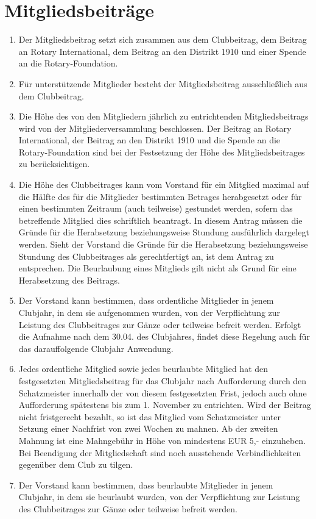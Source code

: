 \documentclass{article}
\begin{document}
\section{Mitgliedsbeiträge}
\begin{enumerate}
    \item Der Mitgliedsbeitrag setzt sich zusammen aus dem Clubbeitrag, dem Beitrag an Rotary International, dem Beitrag an den Distrikt 1910 und einer Spende an die Rotary-Foundation.
    \item Für unterstützende Mitglieder besteht der Mitgliedsbeitrag ausschließlich aus dem Clubbeitrag.
    \item Die Höhe des von den Mitgliedern jährlich zu entrichtenden Mitgliedsbeitrags wird von der Mitgliederversammlung beschlossen. Der Beitrag an Rotary International, der Beitrag an den Distrikt 1910 und die Spende an die Rotary-Foundation sind bei der Festsetzung der Höhe des Mitgliedsbeitrages zu berücksichtigen.
    \item Die Höhe des Clubbeitrages kann vom Vorstand für ein Mitglied maximal auf die Hälfte des für die Mitglieder bestimmten Betrages herabgesetzt oder für einen bestimmten Zeitraum (auch teilweise) gestundet werden, sofern das betreffende Mitglied dies schriftlich beantragt. In diesem Antrag müssen die Gründe für die Herabsetzung beziehungsweise Stundung ausführlich dargelegt werden. Sieht der Vorstand die Gründe für die Herabsetzung beziehungsweise Stundung des Clubbeitrages als gerechtfertigt an, ist dem Antrag zu entsprechen. Die Beurlaubung eines Mitglieds gilt nicht als Grund für eine Herabsetzung des Beitrags.
    \item Der Vorstand kann bestimmen, dass ordentliche Mitglieder in jenem Clubjahr, in dem sie aufgenommen wurden, von der Verpflichtung zur Leistung des Clubbeitrages zur Gänze oder teilweise befreit werden. Erfolgt die Aufnahme nach dem 30.04. des Clubjahres, findet diese Regelung auch für das darauffolgende Clubjahr Anwendung.
    \item Jedes ordentliche Mitglied sowie jedes beurlaubte Mitglied hat den festgesetzten Mitgliedsbeitrag für das Clubjahr nach Aufforderung durch den Schatzmeister innerhalb der von diesem festgesetzten Frist, jedoch auch ohne Aufforderung spätestens bis zum 1. November zu entrichten. Wird der Beitrag nicht fristgerecht bezahlt, so ist das Mitglied vom Schatzmeister unter Setzung einer Nachfrist von zwei Wochen zu mahnen. Ab der zweiten Mahnung ist eine Mahngebühr in Höhe von mindestens EUR 5,- einzuheben. Bei Beendigung der Mitgliedschaft sind noch ausstehende Verbindlichkeiten gegenüber dem Club zu tilgen.
    \item Der Vorstand kann bestimmen, dass beurlaubte Mitglieder in jenem Clubjahr, in dem sie beurlaubt wurden, von der Verpflichtung zur Leistung des Clubbeitrages zur Gänze oder teilweise befreit werden.
\end{enumerate}
\end{document}
